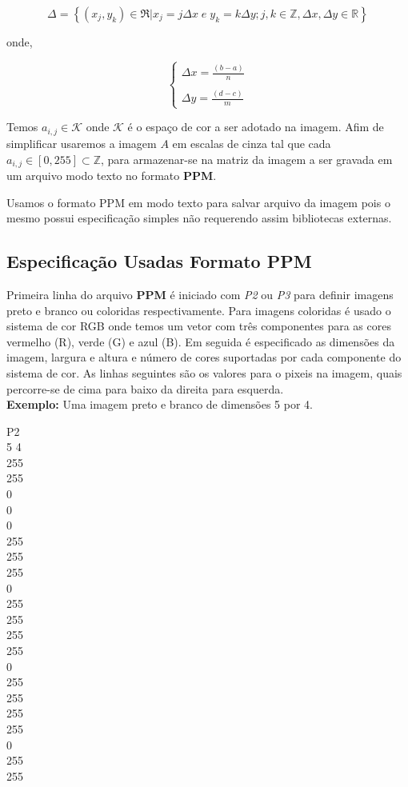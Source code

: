 \documentclass[12pt,a4paper]{article}
\begin{document}
	$$ \Delta = \left\{ (x_j, y_k ) \in \mathfrak{R} | x_j= j \Delta x \; e \; y_k = k \Delta y; j,k \in \mathbb{Z}, \Delta x, \Delta y \in \mathbb{R}   \right\} $$
	
	\noindent
	onde,
	
	{\large 
	\[
		\begin{cases}
			\Delta x = \frac{(b - a)}{n} \\ \\
			\Delta y = \frac{ ( d - c )}{m}
			
		\end{cases}
	\]}
	
	Temos $a_{i,j} \in \mathcal{K}$ onde $\mathcal{K}$ é o espaço de cor a ser adotado na imagem. Afim de simplificar usaremos a imagem $A$ em escalas de cinza tal que cada $a_{i,j} \in [0, 255] \subset \mathbb{Z}$, para armazenar-se na matriz da imagem a ser gravada em um arquivo modo texto no formato \textbf{PPM}.
	
	
	Usamos o formato PPM em modo texto para salvar arquivo da imagem pois o mesmo possui especificação simples não requerendo assim bibliotecas externas. \\
	
	\newpage
	\noindent
	\subsection{Especificação Usadas Formato PPM}
	
	Primeira linha do arquivo \textbf{PPM} é iniciado com \textit{P2} ou \textit{P3} para definir imagens preto e branco ou coloridas respectivamente. Para imagens coloridas é usado o sistema de cor RGB onde temos um vetor com três componentes para as cores vermelho (R), verde (G) e azul (B). Em seguida é especificado as dimensões da imagem, largura e altura e número de cores suportadas por cada componente do sistema de cor. As linhas seguintes são os valores para o pixeis na imagem, quais percorre-se de cima para baixo da direita para esquerda. \\
	
	\textbf{Exemplo:} Uma imagem preto e branco de dimensões 5 por 4.

	\noindent
	P2 \\
	5 4 \\
	255 \\
	255 \\
	0 \\
	0 \\
	0 \\
	255 \\
	255 \\
	255 \\
	0 \\
	255 \\
	255 \\
	255 \\
	255 \\
	0 \\
	255 \\
	255 \\
	255 \\
	255 \\
	0 \\
	255 \\
	255 \\
	
\end{document}
